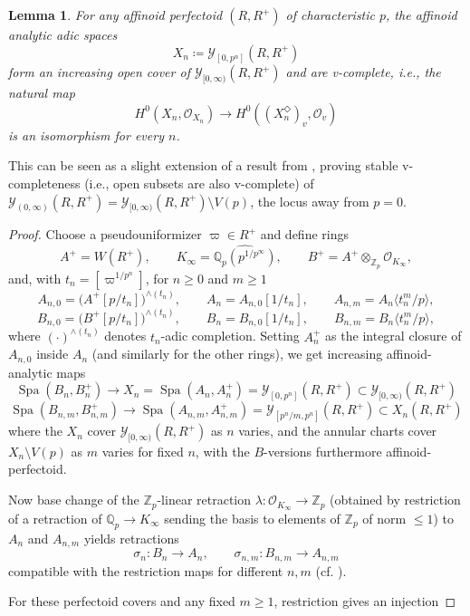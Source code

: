 \documentclass[10pt,twoside]{article}
\numberwithin{equation}{section}
\theoremstyle{plain}
\newtheorem{mylemma}[mythm]{Lemma}
\theoremstyle{definition}
\DeclareMathOperator{\Spa}{Spa}
\newcommand{\ZZ}{\mathbb{Z}}
\newcommand{\QQ}{\mathbb{Q}}
\newcommand{\MCO}{\mathcal{O}}
\newcommand{\MCY}{\mathcal{Y}}
\let \diamond \Diamond
\newcommand{\Yco}{\MCY_{[0,\infty)}}
\newcommand{\Yoo}{\MCY_{(0,\infty)}}
\begin{document}
\begin{mylemma}\label{lemmaVComplete}
For any affinoid perfectoid \((R,R^+)\) of characteristic \(p\), the affinoid analytic adic spaces
\[X_n\coloneqq\MCY_{[0,p^n]}(R,R^+)\]
form an increasing open cover of \(\Yco(R,R^+)\) and are v-complete, i.e., the natural map
\[H^0(X_n,\MCO_{X_n})\longrightarrow H^0((X_n^\diamond)_v,\MCO_v)\]
is an isomorphism for every \(n\).
\end{mylemma}

This can be seen as a slight extension of a result from \cite[Proposition 9.9]{KimIgusa}, proving stable v-completeness (i.e., open subsets are also v-complete) of \(\Yoo(R,R^+)=\Yco(R,R^+)\setminus V(p)\), the locus away from \(p=0\).

\begin{proof}
Choose a pseudouniformizer \(\varpi\in R^+\) and define rings
    \[
        A^+=W(R^+),\qquad K_\infty=\widehat{\QQ_p(p^{1/p^\infty})},\qquad
        B^+=A^+\otimes_{\ZZ_p}\MCO_{K_\infty},
    \]
    and, with \(t_n=[\varpi^{1/p^n}]\), for \(n\geq0\) and \(m\geq1\)
    \[
        A_{n,0}=\bigl(A^+[p/t_n]\bigr)^{\wedge(t_n)},\qquad
		A_n=A_{n,0}[1/t_n],\qquad
		A_{n,m}=A_n\langle t_n^m/p\rangle,
	\]
	\[
        B_{n,0}=\bigl(B^+[p/t_n]\bigr)^{\wedge(t_n)},\qquad
		B_n=B_{n,0}[1/t_n],\qquad
		B_{n,m}=B_n\langle t_n^m/p\rangle,
    \]
    where \((\cdot)^{\wedge(t_n)}\) denotes \(t_n\)-adic completion.
	Setting \(A_n^+\) as the integral closure of \(A_{n,0}\) inside \(A_n\) (and similarly for the other rings), we get increasing affinoid-analytic maps 
	\[\Spa(B_n,B_n^+)\longrightarrow X_n=\Spa(A_n,A_n^+)=\MCY_{[0,p^n]}(R,R^+)\subset \Yco(R,R^+) \]
	\[\Spa(B_{n,m},B_{n,m}^+)\longrightarrow \Spa(A_{n,m},A_{n,m}^+)=\MCY_{[p^n/m,p^n]}(R,R^+)\subset X_n(R,R^+) \]
		where the \(X_n\) cover \(\Yco(R,R^+)\) as \(n\) varies, and the annular charts cover \(X_n\setminus V(p)\) as \(m\) varies for fixed \(n\),
with the \(B\)-versions furthermore affinoid-perfectoid.\par
Now base change of the \(\ZZ_p\)-linear retraction \(\lambda:\MCO_{K_\infty}\to\ZZ_p\) (obtained by restriction of a retraction of \(\QQ_p\to K_\infty\) sending the basis to elements of \(\ZZ_p\) of norm \(\leq 1\)) to \(A_n\) and \(A_{n,m}\) yields retractions
    \[
        \sigma_n:B_n\longrightarrow A_n,\qquad
        \sigma_{n,m}:B_{n,m}\longrightarrow A_{n,m}
    \]
	compatible with the restriction maps for different \(n,m\) (cf. \cite[proof of Proposition II.1.1]{FS21}). \par
    For these perfectoid covers and any fixed \(m\geq1\), restriction gives an injection

\end{proof}
\end{document}
